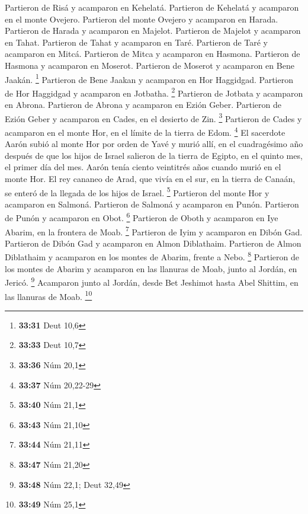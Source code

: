 \begin{paracol}{2}
Partieron de Risá y acamparon en Kehelatá.  Partieron de
Kehelatá y acamparon en el monte Ovejero.  Partieron del
monte Ovejero y acamparon en Harada.  Partieron de Harada
y acamparon en Majelot.  Partieron de Majelot y acamparon
en Tahat.  Partieron de Tahat y acamparon en Taré.
 Partieron de Taré y acamparon en Mitcá. 
Partieron de Mitca y acamparon en Hasmona.  Partieron de
Hasmona y acamparon en Moserot.  Partieron de Moserot y
acamparon en Bene Jaakán. \footnote{\textbf{33:31} Deut 10,6}
 Partieron de Bene Jaakan y acamparon en Hor Haggidgad.
 Partieron de Hor Haggidgad y acamparon en Jotbatha.
\footnote{\textbf{33:33} Deut 10,7}  Partieron de Jotbata
y acamparon en Abrona.  Partieron de Abrona y acamparon
en Ezión Geber.  Partieron de Ezión Geber y acamparon en
Cades, en el desierto de Zin. \footnote{\textbf{33:36} Núm 20,1}
 Partieron de Cades y acamparon en el monte Hor, en el
límite de la tierra de Edom. \footnote{\textbf{33:37} Núm 20,22-29}
 El sacerdote Aarón subió al monte Hor por orden de Yavé
y murió allí, en el cuadragésimo año después de que los hijos de Israel
salieron de la tierra de Egipto, en el quinto mes, el primer día del
mes.  Aarón tenía ciento veintitrés años cuando murió en
el monte Hor.  El rey cananeo de Arad, que vivía en el
sur, en la tierra de Canaán, se enteró de la llegada de los hijos de
Israel. \footnote{\textbf{33:40} Núm 21,1}  Partieron del
monte Hor y acamparon en Salmoná.  Partieron de Salmoná y
acamparon en Punón.  Partieron de Punón y acamparon en
Obot. \footnote{\textbf{33:43} Núm 21,10}  Partieron de
Oboth y acamparon en Iye Abarim, en la frontera de Moab. \footnote{\textbf{33:44}
  Núm 21,11}  Partieron de Iyim y acamparon en Dibón Gad.
 Partieron de Dibón Gad y acamparon en Almon Diblathaim.
 Partieron de Almon Diblathaim y acamparon en los montes
de Abarim, frente a Nebo. \footnote{\textbf{33:47} Núm 21,20}
 Partieron de los montes de Abarim y acamparon en las
llanuras de Moab, junto al Jordán, en Jericó. \footnote{\textbf{33:48}
  Núm 22,1; Deut 32,49}  Acamparon junto al Jordán, desde
Bet Jeshimot hasta Abel Shittim, en las llanuras de Moab. \footnote{\textbf{33:49}
  Núm 25,1}


\end{paracol}
